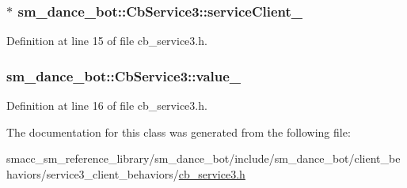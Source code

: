 \subsubsection[{\texorpdfstring{service\+Client\+\_\+}{serviceClient_}}]{$\ast$ sm\+\_\+dance\+\_\+bot\+::\+Cb\+Service3\+::service\+Client\+\_\+\hspace{0.3cm}{\ttfamily [private]}}\hypertarget{classsm__dance__bot_1_1CbService3_a23064503560f82cf5d6e24e393c2aa9c}{}\label{classsm__dance__bot_1_1CbService3_a23064503560f82cf5d6e24e393c2aa9c}


Definition at line 15 of file cb\+\_\+service3.\+h.

\subsubsection[{\texorpdfstring{value\+\_\+}{value_}}]{ sm\+\_\+dance\+\_\+bot\+::\+Cb\+Service3\+::value\+\_\+\hspace{0.3cm}{\ttfamily [private]}}\hypertarget{classsm__dance__bot_1_1CbService3_a82b3136997a198b0c880ef1b170e7502}{}\label{classsm__dance__bot_1_1CbService3_a82b3136997a198b0c880ef1b170e7502}


Definition at line 16 of file cb\+\_\+service3.\+h.



The documentation for this class was generated from the following file\+:\begin{DoxyCompactItemize}
\item 
smacc\+\_\+sm\+\_\+reference\+\_\+library/sm\+\_\+dance\+\_\+bot/include/sm\+\_\+dance\+\_\+bot/client\+\_\+behaviors/service3\+\_\+client\+\_\+behaviors/\hyperlink{cb__service3_8h}{cb\+\_\+service3.\+h}\end{DoxyCompactItemize}
